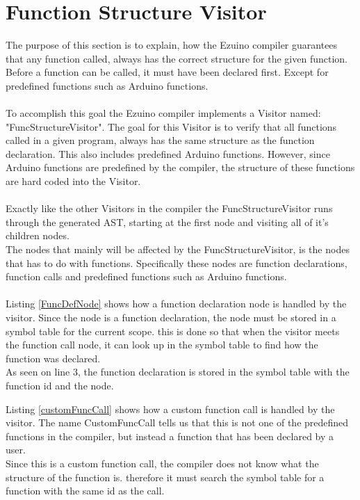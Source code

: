 \section{Function Structure Visitor}
The purpose of this section is to explain, how the Ezuino compiler guarantees that any function called, always has the correct structure for the given function. Before a function can be called, it must have been declared first. Except for predefined functions such as Arduino functions.
\\\\
To accomplish this goal the Ezuino compiler implements a Visitor named: "FuncStructureVisitor". The goal for this Visitor is to verify that all functions called in a given program, always has the same structure as the function declaration. This also includes predefined Arduino functions. However, since Arduino functions are predefined by the compiler, the structure of these functions are hard coded into the Visitor.
\\\\
Exactly like the other Visitors in the compiler the FuncStructureVisitor runs through the generated AST, starting at the first node and visiting all of it's children nodes.\\
The nodes that mainly will be affected by the FuncStructureVisitor, is the nodes that has to do with functions. Specifically these nodes are function declarations, function calls and predefined functions such as Arduino functions.
\\\\
Listing \ref{FuncDefNode} shows how a function declaration node is handled by the visitor. Since the node is a function declaration, the node must be stored in a symbol table for the current scope. this is done so that when the visitor meets the function call node, it can look up in the symbol table to find how the function was declared.\\
As seen on line 3, the function declaration is stored in the symbol table with the function id and the node.

\noindent\newline
Listing \ref{customFuncCall} shows how a custom function call is handled by the visitor. The name CustomFuncCall tells us that this is not one of the predefined functions in the compiler, but instead a function that has been declared by a user.\\
Since this is a custom function call, the compiler does not know what the structure of the function is. therefore it must search the symbol table for a function with the same id as the call.\\
